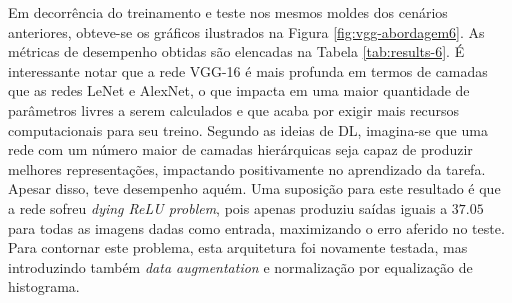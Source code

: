 	Em decorrência do treinamento e teste nos mesmos moldes dos cenários anteriores, obteve-se os gráficos ilustrados na Figura \ref{fig:vgg-abordagem6}. As métricas de desempenho obtidas são elencadas na Tabela \ref{tab:results-6}.	É interessante notar que a rede VGG-16 é mais profunda em termos de camadas que as redes LeNet e AlexNet, o que impacta em uma maior quantidade de parâmetros livres a serem calculados e que acaba por exigir mais recursos computacionais para seu treino. Segundo as ideias de DL, imagina-se que uma rede com um número maior de camadas hierárquicas seja capaz de produzir melhores representações, impactando positivamente no aprendizado da tarefa. Apesar disso, teve desempenho aquém. Uma suposição para este resultado é que a rede sofreu \emph{dying ReLU problem}, pois apenas produziu saídas iguais a $37.05$ para todas as imagens dadas como entrada, maximizando o erro aferido no teste. Para contornar este problema, esta arquitetura foi novamente testada, mas introduzindo também \emph{data augmentation} e normalização por equalização de histograma.

